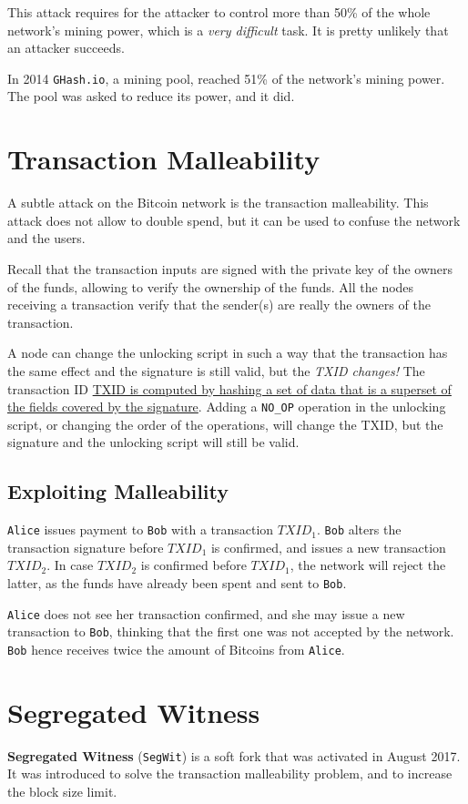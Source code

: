 This attack requires for the attacker to control more than 50\% of the whole network's mining power, which is a \textit{very difficult} task. It is pretty unlikely that an attacker succeeds.

In 2014 \texttt{GHash.io}, a mining pool, reached 51\% of the network's mining power. The pool was asked to reduce its power, and it did.

\section{Transaction Malleability}
A subtle attack on the Bitcoin network is the transaction malleability. This attack does not allow to double spend, but it can be used to confuse the network and the users.

Recall that the transaction inputs are signed with the private key of the owners of the funds, allowing to verify the ownership of the funds.
All the nodes receiving a transaction verify that the sender(s) are really the owners of the transaction.

A node can change the unlocking script in such a way that the transaction has the same effect and the signature is still valid, but the \textit{TXID changes!}
The transaction ID \ul{TXID is computed by hashing a set of data that is a superset of the fields covered by the signature}.
Adding a \texttt{NO\_OP} operation in the unlocking script, or changing the order of the operations, will change the TXID, but the signature and the unlocking script will still be valid.

\subsection{Exploiting Malleability}
\texttt{Alice} issues payment to \texttt{Bob} with a transaction $TXID_1$.
\texttt{Bob} alters the transaction signature before $TXID_1$ is confirmed, and issues a new transaction $TXID_2$.
In case $TXID_2$ is confirmed before $TXID_1$, the network will reject the latter, as the funds have already been spent and sent to \texttt{Bob}.

\texttt{Alice} does not see her transaction confirmed, and she may issue a new transaction to \texttt{Bob}, thinking that the first one was not accepted by the network.
\texttt{Bob} hence receives twice the amount of Bitcoins from \texttt{Alice}.

\section{Segregated Witness}
\textbf{Segregated Witness} (\texttt{SegWit}) is a soft fork that was activated in August 2017. It was introduced to solve the transaction malleability problem, and to increase the block size limit.

